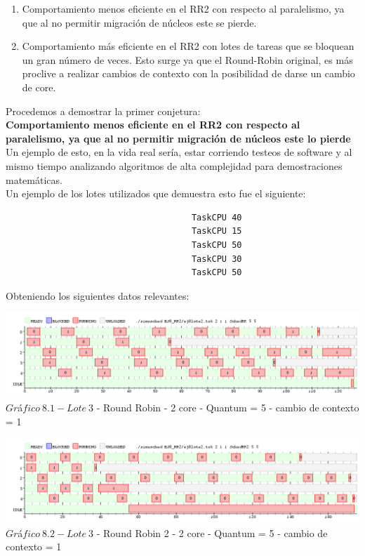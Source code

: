 \begin{enumerate}
\item Comportamiento menos eficiente en el RR2 con respecto al paralelismo, ya que al no permitir
migración de n\'ucleos este se pierde.
\item Comportamiento más eficiente en el RR2 con lotes de tareas que se bloquean un gran n\'{u}mero
de veces. Esto surge ya que el Round-Robin original, es m\'as proclive a realizar cambios de contexto con la posibilidad
de darse un cambio de core.
\end{enumerate}
 
 Procedemos a demostrar la primer conjetura:\\
 
 \textbf{Comportamiento menos eficiente en el RR2 con respecto al paralelismo, ya que al no permitir
migración de núcleos este lo pierde}\\

Un ejemplo de esto, en la vida real ser\'ia, estar corriendo testeos de software y al mismo tiempo analizando
algoritmos de alta complejidad para demostraciones matem\'{a}ticas.\\

Un ejemplo de los lotes utilizados que demuestra esto fue el siguiente:\\

\begin{verbatim}
                                     TaskCPU 40
                                     TaskCPU 15
                                     TaskCPU 50
                                     TaskCPU 30
                                     TaskCPU 50
\end{verbatim}

Obteniendo los siguientes datos relevantes:\\

\begin{center}
    	\includegraphics[width=450pt]{./EJ8_RR2/dif10corerr.png}
	{$Gr$\'a$fico \ 8.1 -Lote \ 3$ - Round Robin - 2 core - Quantum = 5 - cambio de contexto = 1}	
 \end{center}
 
 \begin{center}
    	\includegraphics[width=450pt]{./EJ8_RR2/dif10corerr2.png}
	{$Gr$\'a$fico \ 8.2 - Lote \ 3$ - Round Robin 2 - 2 core - Quantum = 5 - cambio de contexto = 1}	
 \end{center}
 
